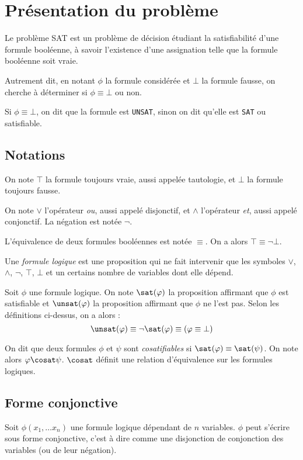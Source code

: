 \section{Présentation du problème}
Le problème SAT est un problème de décision étudiant la satisfiabilité d'une
formule booléenne, à savoir l'existence d'une assignation telle que la formule
booléenne soit vraie.

Autrement dit, en notant $\phi$ la formule considérée et $\bot$ la formule
fausse, on cherche à déterminer si $\phi\equiv\bot$ ou non.

Si $\phi\equiv\bot$, on dit que la formule est \texttt{UNSAT}, sinon on dit
qu'elle est \texttt{SAT} ou satisfiable.

\subsection{Notations}
On note $\top$ la formule toujours vraie, aussi appelée tautologie, et $\bot$
la formule toujours fausse.

On note $\vee$ l'opérateur \textit{ou}, aussi appelé disjonctif, et $\wedge$
l'opérateur \textit{et}, aussi appelé conjonctif. La négation est notée $\neg$.

L'équivalence de deux formules booléennes est notée $\equiv$. On a alors
$\top\equiv\neg\bot$.

Une \textit{formule logique} est une proposition qui ne fait intervenir que les
symboles $\vee$, $\wedge$, $\neg$, $\top$, $\bot$ et un certains nombre de
variables dont elle dépend.

Soit $\phi$ une formule logique. On note $\sat(\phi)$ la proposition affirmant
que $\phi$ est satisfiable et $\unsat(\phi)$ la proposition affirmant que $\phi$
ne l'est pas. Selon les définitions ci-dessus, on a alors :
\[ \unsat(\phi) \equiv \neg \sat(\phi) \equiv (\phi \equiv \bot) \]

On dit que deux formules $\phi$ et $\psi$ sont \textit{cosatifiables} si
$\sat(\phi)\equiv\sat(\psi)$. On note alors $\phi\cosat\psi$. $\cosat$ définit
une relation d'équivalence sur les formules logiques.

\subsection{Forme conjonctive}
Soit $\phi(x_1, \dots x_n)$ une formule logique dépendant de $n$ variables.
$\phi$ peut s'écrire sous forme conjonctive, c'est à dire comme une disjonction
de conjonction des variables (ou de leur négation).

